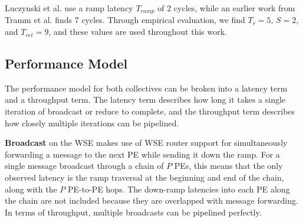 \documentclass[conference]{IEEEtran}
\begin{document}
Luczynski et al. use a ramp latency $T_{ramp}$ of 2 cycles, while an earlier work from Tramm et al. finds 7 cycles. Through empirical evaluation, we find $T_r = 5$, $S = 2$, and $T_{ret} = 9$, and these values are used throughout this work.







\subsection{Performance Model}

The performance model for both collectives can be broken into a latency term and a throughput term. The latency term describes how long it takes a single iteration of broadcast or reduce to complete, and the throughput term describes how closely multiple iterations can be pipelined.

\textbf{Broadcast} on the WSE makes use of WSE router support for simultaneously forwarding a message to the next PE while sending it down the ramp. For a single message broadcast through a chain of $P$ PEs, this means that the only observed latency is the ramp traversal at the beginning and end of the chain, along with the $P$ PE-to-PE hops. The down-ramp latencies into each PE along the chain are not included because they are overlapped with message forwarding. In terms of throughput, multiple broadcasts can be pipelined perfectly.
\end{document}
